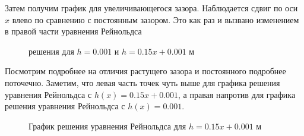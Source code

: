 \documentclass[a4paper,14pt]{extarticle}
\begin{document}
Затем получим график для увеличивающегося зазора. Наблюдается сдвиг по оси $x$ влево по сравнению с постоянным зазором. Это как раз и вызвано изменением в правой части уравнения Рейнольдса
\begin{figure}[!htbp]
	\caption{решения для $h = 0.001$ и $h = 0.15 x + 0.001$ м}
	\label{res_pos}
\end{figure}

\newpage

Посмотрим подробнее на отличия растущего зазора и постоянного подробнее поточечно. Заметим, что левая часть точек чуть выше для графика решения уравнения Рейнольдса с  $h(x) = 0.15x + 0.001$, а правая напротив для графика решения уравнения Рейнольдса с $h(x) = 0.001$.

\begin{figure}[!htbp]
	\caption{График решения уравнения Рейнольдса для $h = 0.15 x + 0.001$ м}
	\label{pos_res_diff}
\end{figure}
\end{document}
